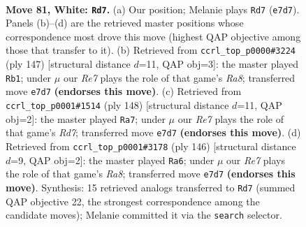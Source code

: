 \documentclass[11pt]{article}
\begin{document}
\clearpage

\begin{figure}[p]\centering
\begin{subfigure}{0.46\textwidth}\centering
\resizebox{\linewidth}{!}{%
\newchessgame
\chessboard[
  setfen={5rk1/P3R3/8/8/8/8/6K1/8 w - - 31 81},
  showmover=false,
  pgfstyle=straightmove, color=movearrow, markmove={e7-d7}
]}
\caption{}
\end{subfigure}\hfill
\begin{subfigure}{0.46\textwidth}\centering
\resizebox{\linewidth}{!}{%
\newchessgame
\chessboard[
  setfen={8/8/6k1/6p1/8/8/5RKP/r7 b - - 11 74},
  showmover=false,
  pgfstyle=straightmove, color=movearrow, markmove={a1-b1}
]}
\caption{}
\end{subfigure}
\\[4pt]
\begin{subfigure}{0.46\textwidth}\centering
\resizebox{\linewidth}{!}{%
\newchessgame
\chessboard[
  setfen={8/3R4/8/6pP/4kr2/8/8/3K4 w - - 16 75},
  showmover=false,
  pgfstyle=straightmove, color=movearrow, markmove={d7-a7}
]}
\caption{}
\end{subfigure}\hfill
\begin{subfigure}{0.46\textwidth}\centering
\resizebox{\linewidth}{!}{%
\newchessgame
\chessboard[
  setfen={R7/4rk2/8/5PK1/8/5P2/8/8 w - - 17 74},
  showmover=false,
  pgfstyle=straightmove, color=movearrow, markmove={a8-a6}
]}
\caption{}
\end{subfigure}
\caption{\textbf{Move 81, White: \texttt{Rd7}.} (a) Our position; Melanie plays \texttt{Rd7} (\texttt{e7d7}). Panels (b)--(d) are the retrieved master positions whose correspondence most drove this move (highest QAP objective among those that transfer to it). (b) Retrieved from \texttt{ccrl\_top\_p0000\#3224} (ply 147) [structural distance $d$=11, QAP obj=3]: the master played \texttt{Rb1}; under $\mu$ our \emph{Re7} plays the role of that game's \emph{Ra8}; transferred move \texttt{e7d7} \textbf{(endorses this move)}. (c) Retrieved from \texttt{ccrl\_top\_p0001\#1514} (ply 148) [structural distance $d$=11, QAP obj=2]: the master played \texttt{Ra7}; under $\mu$ our \emph{Re7} plays the role of that game's \emph{Rd7}; transferred move \texttt{e7d7} \textbf{(endorses this move)}. (d) Retrieved from \texttt{ccrl\_top\_p0001\#3178} (ply 146) [structural distance $d$=9, QAP obj=2]: the master played \texttt{Ra6}; under $\mu$ our \emph{Re7} plays the role of that game's \emph{Ra8}; transferred move \texttt{e7d7} \textbf{(endorses this move)}. Synthesis: 15 retrieved analogs transferred to \texttt{Rd7} (summed QAP objective 22, the strongest correspondence among the candidate moves); Melanie committed it via the \texttt{search} selector.}
\label{fig:thought-m160}
\end{figure}
\end{document}
